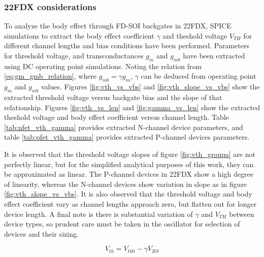 			\FloatBarrier
	\subsubsection{22FDX considerations}
		To analyze the body effect through FD-SOI backgates in 22FDX, SPICE simulations to extract the body effect coefficient $\gamma$ and theshold voltage $V_{TH}$ for different channel lengths and bias conditions have been performed. Parameters for threshold voltage, and transconductances $g_m$ and $g_{mb}$ have been extracted using DC operating point simulations. Noting the relation from \ref{eq:gm_gmb_relation}, where $g_{mb} = \gamma g_{m}$, $\gamma$ can be deduced from operating point $g_m$ and $g_{mb}$ values. Figures \ref{fig:vth_vs_vbs} and \ref{fig:vth_slope_vs_vbs} show the extracted threshold voltage versus backgate bias and the slope of that relationship. Figures \ref{fig:vth_vs_len} and \ref{fig:gamma_vs_len} show the extracted theshold voltage and body effect coefficient versus channel length. Table \ref{tab:nfet_vth_gamma} provides extracted N-channel device parameters, and table \ref{tab:pfet_vth_gamma} provides extracted P-channel devices parameters.

		It is observed that the threshold voltage slopes of figure \ref{fig:vth_groupa} are not perfectly linear, but for the simplified analytical purposes of this work, they can be approximated as linear. The P-channel devices in 22FDX show a high degree of linearity, whereas the N-channel devices show variation in slope as in figure \ref{fig:vth_slope_vs_vbs}. It is also observed that the threshold voltage and body effect coefficient vary as channel lengths approach zero, but flatten out for longer device length. A final note is there is substantial variation of $\gamma$ and $V_{TH}$ between device types, so prudent care must be taken in the oscillator for selection of devices and their sizing.

		\begin{equation}
		V_{th} = V_{th0} - \gamma V_{BS}
		\end{equation}

